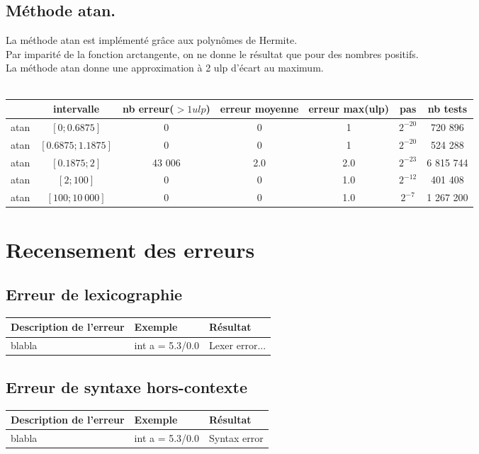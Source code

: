 \documentclass[a4,12pt]{article}
\begin{document}
\subsection{Méthode atan.}
La méthode atan est implémenté grâce aux polynômes de Hermite.\\
Par imparité de la fonction arctangente, on ne donne le résultat que pour des nombres positifs.\\
La méthode atan donne une approximation à 2 ulp d'écart au maximum.\\
\\

\hspace{-3cm}
\begin{tabular}{|c|c|c|c|c|c|c|}

\hline
 & intervalle & nb erreur($>1 ulp$) & erreur moyenne & erreur max(ulp) & pas & nb tests \\
\hline
atan & $[0; 0.6875]$ & 0 & 0 & 1 &$2^{-20}$ & 720 896\\
\hline
atan & $[0.6875; 1.1875]$ & 0 & 0 & 1 & $2^{-20}$ & 524 288\\
\hline
atan & $[0.1875; 2]$ & 43 006 & 2.0 & 2.0 & $2^{-23}$ & 6 815 744\\
\hline
atan & $[2; 100]$ & 0 & 0 & 1.0 & $2^{-12}$ & 401 408\\
\hline
atan & $[100; 10\ 000]$ & 0 & 0 & 1.0 & $2^{-7}$ & 1 267 200\\
\hline
\end{tabular}
\section{Recensement des erreurs}

\subsection{Erreur de lexicographie}
\begin{tabular}{|l|l|l|}
\hline
   Description de l'erreur & Exemple & Résultat \\
   \hline
   blabla & int a = 5.3/0.0 & Lexer error...  \\
   \hline
\end{tabular}
\subsection{Erreur de syntaxe hors-contexte}
\begin{tabular}{|l|l|l|}
\hline
   Description de l'erreur & Exemple & Résultat \\
   \hline
   blabla & int a = 5.3/0.0 & Syntax error  \\
   \hline
\end{tabular}
\end{document}
